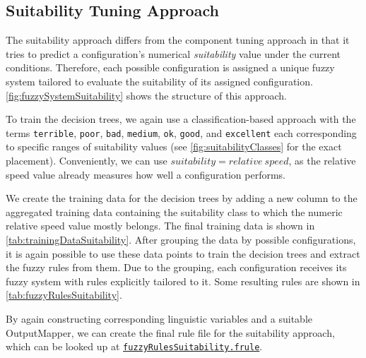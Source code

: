 \newpage

\subsection{Suitability Tuning Approach}

The suitability approach differs from the component tuning approach in that it tries to predict a configuration's numerical \emph{suitability} value under the current conditions. Therefore, each possible configuration is assigned a unique fuzzy system tailored to evaluate the suitability of its assigned configuration. \autoref{fig:fuzzySystemSuitability} shows the structure of this approach.

\smallskip

To train the decision trees, we again use a classification-based approach with the terms \texttt{terrible}, \texttt{poor}, \texttt{bad}, \texttt{medium}, \texttt{ok}, \texttt{good}, and \texttt{excellent} each corresponding to specific ranges of suitability values (see \autoref{fig:suitabilityClasses} for the exact placement). Conveniently, we can use $suitability = relative \ speed$, as the relative speed value already measures how well a configuration performs.

\smallskip

We create the training data for the decision trees by adding a new column to the aggregated training data containing the suitability class to which the numeric relative speed value mostly belongs. The final training data is shown in \autoref{tab:trainingDataSuitability}. After grouping the data by possible configurations, it is again possible to use these data points to train the decision trees and extract the fuzzy rules from them. Due to the grouping, each configuration receives its fuzzy system with rules explicitly tailored to it. Some resulting rules are shown in \autoref{tab:fuzzyRulesSuitability}.

\medskip

\noindent By again constructing corresponding linguistic variables and a suitable OutputMapper, we can create the final rule file for the suitability approach, which can be looked up at \href{https://github.com/AutoPas/AutoPas/blob/f77f10f72c19a86d5471bce287ae3a4ae344c012/examples/md-flexible/input/fuzzyRulesSuitability.frule}{\color{blue}\texttt{fuzzyRulesSuitability.frule}}.

